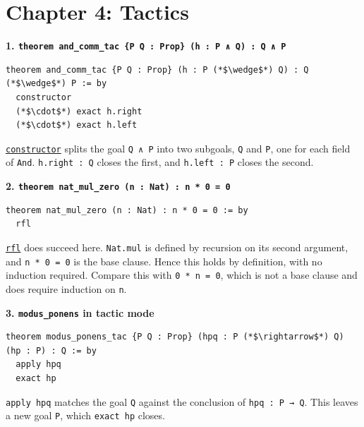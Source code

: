 \section{Chapter 4: Tactics}\label{sec:14-appendix-solutions:03-chapter-4:1}

\textbf{1. \texttt{theorem and\_\allowbreak{}comm\_\allowbreak{}tac \{P Q : Prop\} (h : P ∧ Q) : Q ∧ P}}

\begin{lstlisting}
theorem and_comm_tac {P Q : Prop} (h : P (*$\wedge$*) Q) : Q (*$\wedge$*) P := by
  constructor
  (*$\cdot$*) exact h.right
  (*$\cdot$*) exact h.left
\end{lstlisting}

\href{https://lean-lang.org/doc/reference/latest/Tactic-Proofs/Tactic-Reference/}{\texttt{constructor}} splits the goal \texttt{Q ∧ P} into two subgoals, \texttt{Q} and \texttt{P}, one for each field of \texttt{And}. \texttt{h.right : Q} closes the first, and \texttt{h.left : P} closes the second.

\textbf{2. \texttt{theorem nat\_\allowbreak{}mul\_\allowbreak{}zero (n : Nat) : n * 0 = 0}}

\begin{lstlisting}
theorem nat_mul_zero (n : Nat) : n * 0 = 0 := by
  rfl
\end{lstlisting}

\href{https://lean-lang.org/doc/reference/latest/Tactic-Proofs/Tactic-Reference/}{\texttt{rfl}} does succeed here. \texttt{Nat.mul} is defined by recursion on its second argument, and \texttt{n * 0 = 0} is the base clause. Hence this holds by definition, with no induction required. Compare this with \texttt{0 * n = 0}, which is not a base clause and does require induction on \texttt{n}.

\textbf{3. \texttt{modus\_\allowbreak{}ponens} in tactic mode}

\begin{lstlisting}
theorem modus_ponens_tac {P Q : Prop} (hpq : P (*$\rightarrow$*) Q) (hp : P) : Q := by
  apply hpq
  exact hp
\end{lstlisting}

\texttt{apply hpq} matches the goal \texttt{Q} against the conclusion of \texttt{hpq : P → Q}. This leaves a new goal \texttt{P}, which \texttt{exact hp} closes.
